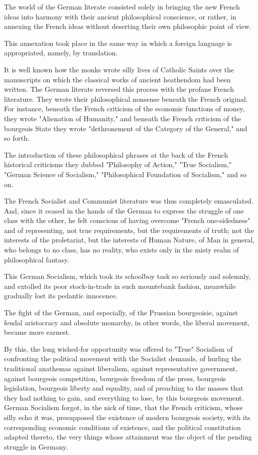 \documentclass[11pt]{book}
\begin{document}
The world of the German literate consisted solely in bringing
the new French ideas into harmony with their ancient philosophical
conscience, or rather, in annexing the French ideas without
deserting their own philosophic point of view.

This annexation took place in the same way in which a foreign
language is appropriated, namely, by translation.

It is well known how the monks wrote silly lives of Catholic
Saints over the manuscripts on which the classical works of
ancient heathendom had been written.  The German literate
reversed this process with the profane French literature.  They
wrote their philosophical nonsense beneath the French original.
For instance, beneath the French criticism of the economic
functions of money, they wrote "Alienation of Humanity," and
beneath the French criticism of the bourgeois State they wrote
"dethronement of the Category of the General," and so forth.

The introduction of these philosophical phrases at the back of
the French historical criticisms they dubbed "Philosophy of
Action," "True Socialism," "German Science of Socialism,"
"Philosophical Foundation of Socialism," and so on.

The French Socialist and Communist literature was thus completely
emasculated. And, since it ceased in the hands of the German to express
the struggle of one class with the other, he felt conscious of having
overcome "French one-sidedness" and of representing, not true
requirements, but the requirements of truth; not the interests of the
proletariat, but the interests of Human Nature, of Man in general, who
belongs to no class, has no reality, who exists only in the misty realm
of philosophical fantasy.

This German Socialism, which took its schoolboy task so seriously
and solemnly, and extolled its poor stock-in-trade in such
mountebank fashion, meanwhile gradually lost its pedantic
innocence.

The fight of the German, and especially, of the Prussian bourgeoisie,
against feudal aristocracy and absolute monarchy, in other words, the
liberal movement, became more earnest.

By this, the long wished-for opportunity was offered to "True"
Socialism of confronting the political movement with the
Socialist demands, of hurling the traditional anathemas
against liberalism, against representative government, against
bourgeois competition, bourgeois freedom of the press, bourgeois
legislation, bourgeois liberty and equality, and of preaching to
the masses that they had nothing to gain, and everything to lose,
by this bourgeois movement.  German Socialism forgot, in the nick
of time, that the French criticism, whose silly echo it was,
presupposed the existence of modern bourgeois society, with its
corresponding economic conditions of existence, and the political
constitution adapted thereto, the very things whose attainment
was the object of the pending struggle in Germany.
\end{document}
